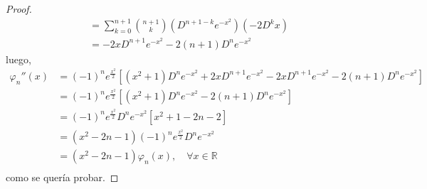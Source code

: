 \documentclass[12pt]{report}
\newcounter{it}
\theoremstyle{largebreak}
\begin{document}
\begin{proof}
\begin{equation*}
\begin{split}
                &=\sum_{ k=0}^{n+1} \binom{n +1}{k} (D^{n+1-k}e^{-x^2})(-2D^k x)\\
                &=-2xD^{n+1}e^{-x^2}-2(n+1)D^{n}e^{-x^2}
            \end{split}
        \end{equation*}
        luego,
        \begin{equation*}
            \begin{split}
                \varphi_n''(x)&=(-1)^ne^{\frac{x^2}{2}}\left[(x^2+1)D^ne^{-x^2}+2xD^{n+1}e^{-x^2}-2xD^{n+1}e^{-x^2}-2(n+1)D^ne^{-x^2} \right]\\
                &=(-1)^ne^{\frac{x^2}{2}}\left[(x^2+1)D^ne^{-x^2}-2(n+1)D^ne^{-x^2} \right]\\
                &=(-1)^ne^{\frac{x^2}{2}}D^ne^{-x^2} \left[x^2+1-2n-2 \right]\\
                &=(x^2-2n-1)(-1)^ne^{\frac{x^2}{2}}D^ne^{-x^2}\\
                &=(x^2-2n-1)\varphi_n(x),\quad\forall x\in\mathbb{R}\\ 
            \end{split}
        \end{equation*}
        como se quería probar.


\end{proof}
\end{document}
